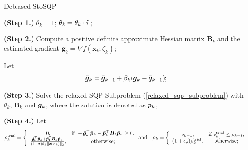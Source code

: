 \documentclass[aos]{imsart}
\numberwithin{equation}{section}
\theoremstyle{plain}
\begin{document}
\begin{algorithm}[htb]
 \caption{Debiased StoSQP 
         }
 \label{alg_stoch_relaxed_sqp_averaging_grad}
 \begin{algorithmic}[1]
 \renewcommand{\algorithmicrequire}{\textbf{Input:} $\bm{\ell} \leq \bm{x}_0 \leq \bm{u}$, $\tau, \Tilde{\tau} \in (0,1)$, $\sigma \in (0,1)$, $\rho_{-1} >0$, $\epsilon_{\rho}, \epsilon_{\xi}, \beta \in (0,1)$, $\mu \in (0,1)$, $\varrho>0$, $\{\beta_k\}_{k=0}^{\infty}$, $\{\gamma_k\}_{k=0}^{\infty}$.}
 \REQUIRE 
  \STATE \textbf{(Step 1.)} $\theta_k = 1$;
  \STATE $\theta_k = \theta_k \cdot \Tilde{\tau}$;

  \ENDWHILE

  \STATE \textbf{(Step 2.)} Compute a positive definite approximate Hessian matrix $\bm{B}_k$ and the estimated gradient $\bm{g}_k = \nabla f(\bm{x}_k; \zeta_{k})$;

  \STATE Let 
  \begin{equation*}
      \Bar{\bm{g}}_k = \Bar{\bm{g}}_{k-1} + \beta_k (\bm{g}_k - \Bar{\bm{g}}_{k-1});
  \end{equation*}
  
  \STATE \textbf{(Step 3.)} Solve the relaxed SQP Subproblem (\ref{relaxed_sqp_subproblem}) with $\theta_k$, $\bm{B}_k$ and $\Bar{\bm{g}}_{k}$, where the solution is denoted as $\Bar{\bm{p}}_k$;

  \STATE \textbf{(Step 4.)} Let \begin{equation}
  \label{stoch_rho_trial}
        \rho_k^{\text{trial}} = \left \{ \begin{array}{cc}
           0,  & \text{if}~ -\Bar{\bm{g}}_k^{\top} \Bar{\bm{p}}_k - \Bar{\bm{p}}_k^{\top} \bm{B}_k \Bar{\bm{p}}_k \geq 0, \\
           \frac{\Bar{\bm{g}}_k^{\top} \Bar{\bm{p}}_k + \Bar{\bm{p}}_k^{\top} \bm{B}_k \Bar{\bm{p}}_k}{(1-\sigma)\theta_k \|\bm{c}(\bm{x}_k)\|_2},  &  \text{otherwise;}
        \end{array}\right. \text{and} \quad 
        \rho_k = \left\{ \begin{array}{cc}
        \rho_{k-1}, &  \text{if}~\rho_{k}^{\text{trial}} \leq \rho_{k-1}, \\
        (1+\epsilon_{\rho})\rho_{k}^{\text{trial}}, & \text{otherwise};
    \end{array} \right.
    \end{equation}
  

\end{algorithmic}
\end{algorithm}
\end{document}
